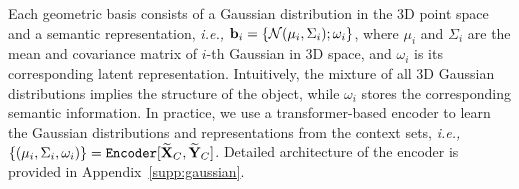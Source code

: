 Each geometric basis consists of a Gaussian distribution in the 3D point space and a semantic representation, \textit{i.e.,} ${\bf{b}}_i = \{ \mathcal{N}(\mu_i, \Sigma_i); \omega_i\}$, 
where $\mu_i$ and $\Sigma_i$ are the mean and covariance matrix of $i$-th Gaussian in 3D space, and $\omega_i$ is its corresponding latent representation. 
Intuitively, the mixture of all 3D Gaussian distributions implies the structure of the object, while $\omega_i$ stores the corresponding semantic information.
In practice, we use a transformer-based encoder to learn the Gaussian distributions and representations from the context sets, \textit{i.e.,} $\{(\mu_i, \Sigma_i, \omega_i)\} = \texttt{Encoder} [{\bf{\widetilde{X}}}_{C}, {\bf{\widetilde{Y}}}_{C}]$. Detailed architecture of the encoder is provided in Appendix~\ref{supp:gaussian}. 




